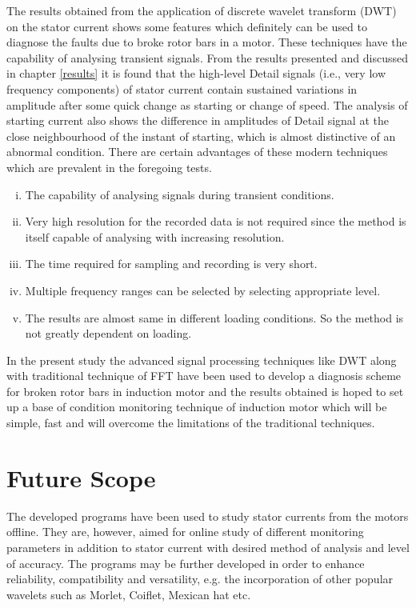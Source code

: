 \documentclass[a4paper,11pt]{report}
\begin{document}
The results obtained from the application of discrete wavelet transform (DWT) on the stator current shows some features which definitely can be used to diagnose the faults due to broke rotor bars in a motor. These techniques have the capability of analysing transient signals. From the results presented and discussed in chapter \ref{results} it is found that the high-level Detail signals (i.e., very low frequency components) of stator current contain sustained variations in amplitude after some quick change as starting or change of speed. The analysis of starting current also shows the difference in amplitudes of Detail signal at the close neighbourhood of the instant of starting, which is almost distinctive of an abnormal condition. There are certain advantages of these modern techniques which are prevalent in the foregoing tests.
\begin{enumerate}[(i)]
\item The capability of analysing signals during transient conditions.
\item Very high resolution for the recorded data is not required since the method is itself capable of  analysing with increasing resolution. 
\item The time required for sampling and recording is very short.
\item Multiple frequency ranges can be selected by selecting appropriate level.
\item The results are almost same in different loading conditions. So the method is not greatly dependent on loading.
\end{enumerate}

In the present study the advanced signal processing techniques like DWT along with traditional technique of FFT have been used to develop a diagnosis scheme for broken rotor bars in induction motor and the results obtained is hoped to set up a base of condition monitoring technique of induction motor which will be simple, fast and will overcome the limitations of the traditional techniques.

\section{Future Scope}
The developed programs have been used to study stator currents from the motors offline. They are, however, aimed for online study of different monitoring parameters in addition to stator current with desired method of analysis and level of accuracy. The programs may be further developed in order to enhance reliability, compatibility and versatility, e.g. the incorporation of other popular wavelets such as Morlet, Coiflet, Mexican hat etc.
\end{document}
